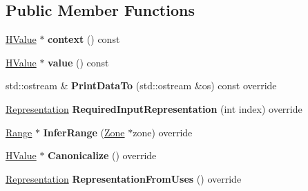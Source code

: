 \subsection*{Public Member Functions}
\begin{DoxyCompactItemize}
\item 
\hyperlink{classv8_1_1internal_1_1_h_value}{H\+Value} $\ast$ {\bfseries context} () const \hypertarget{classv8_1_1internal_1_1_h_unary_math_operation_a40b29efd7bb2c733f0a47ff6d42ae9f7}{}\label{classv8_1_1internal_1_1_h_unary_math_operation_a40b29efd7bb2c733f0a47ff6d42ae9f7}

\item 
\hyperlink{classv8_1_1internal_1_1_h_value}{H\+Value} $\ast$ {\bfseries value} () const \hypertarget{classv8_1_1internal_1_1_h_unary_math_operation_a4bb06ed26f863994bcc73ce99f6bbb49}{}\label{classv8_1_1internal_1_1_h_unary_math_operation_a4bb06ed26f863994bcc73ce99f6bbb49}

\item 
std\+::ostream \& {\bfseries Print\+Data\+To} (std\+::ostream \&os) const  override\hypertarget{classv8_1_1internal_1_1_h_unary_math_operation_ab59c474607491ae48be4ad256c870b17}{}\label{classv8_1_1internal_1_1_h_unary_math_operation_ab59c474607491ae48be4ad256c870b17}

\item 
\hyperlink{classv8_1_1internal_1_1_representation}{Representation} {\bfseries Required\+Input\+Representation} (int index) override\hypertarget{classv8_1_1internal_1_1_h_unary_math_operation_a259f8a227dc56c791d91ca83e015eeb8}{}\label{classv8_1_1internal_1_1_h_unary_math_operation_a259f8a227dc56c791d91ca83e015eeb8}

\item 
\hyperlink{classv8_1_1internal_1_1_range}{Range} $\ast$ {\bfseries Infer\+Range} (\hyperlink{classv8_1_1internal_1_1_zone}{Zone} $\ast$zone) override\hypertarget{classv8_1_1internal_1_1_h_unary_math_operation_a8fe335b3d21266f222dab29f05f7a6bb}{}\label{classv8_1_1internal_1_1_h_unary_math_operation_a8fe335b3d21266f222dab29f05f7a6bb}

\item 
\hyperlink{classv8_1_1internal_1_1_h_value}{H\+Value} $\ast$ {\bfseries Canonicalize} () override\hypertarget{classv8_1_1internal_1_1_h_unary_math_operation_a5ee72abdf0a0f1fa997d2e6bf232213b}{}\label{classv8_1_1internal_1_1_h_unary_math_operation_a5ee72abdf0a0f1fa997d2e6bf232213b}

\item 
\hyperlink{classv8_1_1internal_1_1_representation}{Representation} {\bfseries Representation\+From\+Uses} () override\hypertarget{classv8_1_1internal_1_1_h_unary_math_operation_a31394d2ad2ec13a5b733126690bacd1c}{}\label{classv8_1_1internal_1_1_h_unary_math_operation_a31394d2ad2ec13a5b733126690bacd1c}


\end{DoxyCompactItemize}
